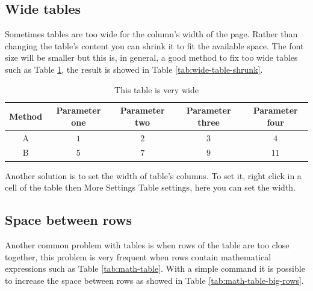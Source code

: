 \subsection{Wide tables}

Sometimes tables are too wide for the column's width of the page.
Rather than changing the table's content you can shrink it to fit
the available space. The font size will be smaller but this is, in
general, a good method to fix too wide tables such as Table \ref{tab:wide-table},
the result is showed in Table \ref{tab:wide-table-shrunk}.

\begin{table}[h]
\caption{\label{tab:wide-table}This table is very wide}

\centering{}%
\begin{tabular}{ccccc}
\toprule 
\textbf{Method} & \textbf{Parameter one} & \textbf{Parameter two} & \textbf{Parameter three} & \textbf{Parameter four}\tabularnewline
\midrule 
A & $1$ & $2$ & $3$ & $4$\tabularnewline
B & $5$ & $7$ & $9$ & $11$\tabularnewline
\bottomrule
\end{tabular}
\end{table}
\begin{table}[h]
\caption{\label{tab:wide-table-shrunk}This table is shrunk to fit the column's
width}

\centering{}
\end{table}
Another solution is to set the width of table's columns. To set it,
right click in a cell of the table then \textsf{More} \textsf{\lyxarrow}
\textsf{Settings} \textsf{\lyxarrow} \textsf{Table settings}, here
you can set the width.

\subsection{Space between rows}

Another common problem with tables is when rows of the table are too
close together, this problem is very frequent when rows contain mathematical
expressions such as Table \ref{tab:math-table}. With a simple command
it is possible to increase the space between rows as showed in Table
\ref{tab:math-table-big-rows}.

